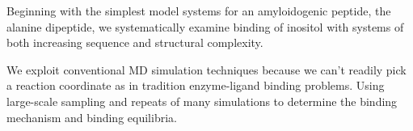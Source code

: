 \1 Beginning with the simplest model systems for an amyloidogenic peptide, the alanine dipeptide, we systematically examine binding of inositol with systems of both increasing sequence and structural complexity.

\1 We exploit conventional MD simulation techniques because we can't readily pick a reaction coordinate as in tradition enzyme-ligand binding problems. Using large-scale sampling and repeats of many simulations to determine the binding mechanism and binding equilibria.








% 
% 
% 
% 
% 


